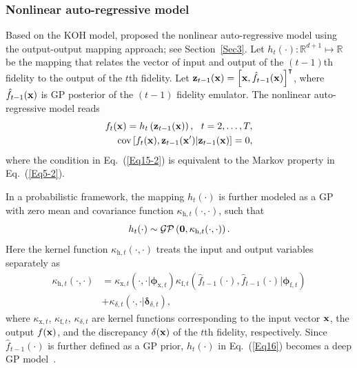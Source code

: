 \documentclass[iicol,sn-basic]{sn-jnl}%
\theoremstyle{thmstyleone}%
\theoremstyle{thmstyletwo}
\theoremstyle{thmstylethree}
\begin{document}
\begin{linenumbers}
\subsubsection{Nonlinear auto-regressive model}\label{Sec524}

Based on the KOH model, \cite{Perdikaris2017} proposed the nonlinear auto-regressive model using the output-output mapping approach; see Section~\ref{Sec3}.
Let $h_{t}(\cdot):\mathbb{R}^{d+1} \mapsto \mathbb{R}$ be the mapping that relates the vector of input and output of the $(t-1)$th fidelity to the output of the $t$th fidelity.
Let ${\bf z}_{t-1}({\bf x})=\left[{\bf x},\hat{f}_{t-1}({\bf x})\right]^\intercal$, where $\hat{f}_{t-1}({\bf x})$ is GP posterior of the $(t-1)$ fidelity emulator.
The nonlinear auto-regressive model reads~\citep{Perdikaris2017}
\begin{subequations}\label{Eq15}
	\begin{align}
		f_{t}({\bf x})=h_{t}\left({{\bf z}_{t-1}({\bf x})}\right), \ \  t=2,\dots,T \label{Eq15-1},\\
		\text{cov}\left[f_{t}({\bf x}),{\bf z}_{t-1}({\bf x}')|{\bf z}_{t-1}({\bf x})\right]=0 
		\label{Eq15-2},
	\end{align}
\end{subequations}
where the condition in Eq.~(\ref{Eq15-2}) is equivalent to the Markov property in Eq.~(\ref{Eq5-2}).

In a probabilistic framework, the mapping $h_{t}(\cdot)$ is further modeled as a GP with zero mean and covariance function $\kappa_{\text{h},t}(\cdot,\cdot)$, such that
\begin{equation}\label{Eq16}
	h_{t}(\cdot) \sim \mathcal{GP}\left({\bf 0}, \kappa_{\text{h},t}(\cdot,\cdot)\right).
\end{equation} 
Here the kernel function $\kappa_{\text{h},t}(\cdot,\cdot)$ treats the input and output variables separately as
\begin{equation}\label{Eq17}
	\begin{aligned}
		\kappa_{\text{h},t}(\cdot,\cdot) & =\kappa_{\text{x},t}(\cdot,\cdot|{\boldsymbol \phi}_{\text{x},t})\kappa_{\text{f},t}(\hat{f}_{t-1}(\cdot),\hat{f}_{t-1}(\cdot)|{\boldsymbol \phi}_{\text{f},t})\\
		& + \kappa_{\delta,t}(\cdot,\cdot|{\boldsymbol \delta}_{\delta,t}),
	\end{aligned}
\end{equation}
where $\kappa_{\text{x},t}$, $\kappa_{\text{f},t}$, $\kappa_{\delta,t}$ are kernel functions corresponding to the input vector ${\bf x}$, the output $f({\bf x})$, and the discrepancy $\delta({\bf x})$ of the $t$th fidelity, respectively.
Since $\hat{f}_{t-1}(\cdot)$ is further defined as a GP prior, $h_{t}(\cdot)$ in Eq.~(\ref{Eq16}) becomes a deep GP model~\citep{Damianou2013}.
 

\end{linenumbers}
\end{document}
